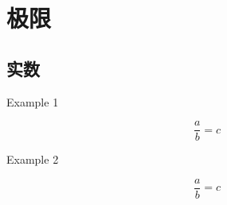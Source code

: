 \documentclass[12pt, a4paper, oneside, UTF8]{ctexbook}
\begin{document}

\fi

\chapter{极限}

\section{实数}

Example 1

\[
    \frac{a}{b} = c
\]

Example 2

\[
    \frac{a}{b} = c
\]

\ifx\allfiles\undefined
\end{document}
